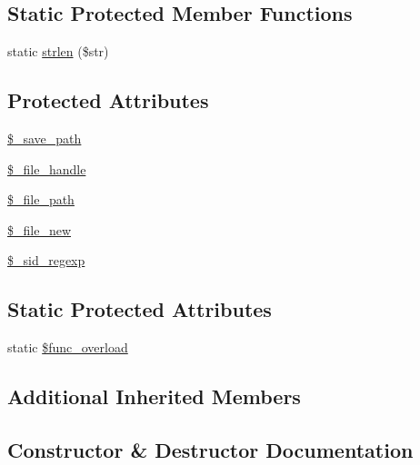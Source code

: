 \subsection*{Static Protected Member Functions}
\begin{DoxyCompactItemize}
\item 
static \mbox{\hyperlink{class_c_i___session__files__driver_a4c29a687d4ed62c26a10e41d98930d5f}{strlen}} (\$str)
\end{DoxyCompactItemize}
\subsection*{Protected Attributes}
\begin{DoxyCompactItemize}
\item 
\mbox{\hyperlink{class_c_i___session__files__driver_a6435cefa01b850e041ae9066224e8a4d}{\$\+\_\+save\+\_\+path}}
\item 
\mbox{\hyperlink{class_c_i___session__files__driver_a5d9e30c347d3adb8f7bd47da3566ce69}{\$\+\_\+file\+\_\+handle}}
\item 
\mbox{\hyperlink{class_c_i___session__files__driver_af2a67abb59f4c991dd98452ec6e6dcc7}{\$\+\_\+file\+\_\+path}}
\item 
\mbox{\hyperlink{class_c_i___session__files__driver_a996c4705d21476b028bf762e63257114}{\$\+\_\+file\+\_\+new}}
\item 
\mbox{\hyperlink{class_c_i___session__files__driver_a4e2477585e746eb415b2b69bb237be72}{\$\+\_\+sid\+\_\+regexp}}
\end{DoxyCompactItemize}
\subsection*{Static Protected Attributes}
\begin{DoxyCompactItemize}
\item 
static \mbox{\hyperlink{class_c_i___session__files__driver_aef84be58d58a5895572c5689e56a1047}{\$func\+\_\+overload}}
\end{DoxyCompactItemize}
\subsection*{Additional Inherited Members}


\subsection{Constructor \& Destructor Documentation}
\mbox{\label{class_c_i___session__files__driver_ac1669c73d53d6f16cf5459a1e84d39c8}} 
